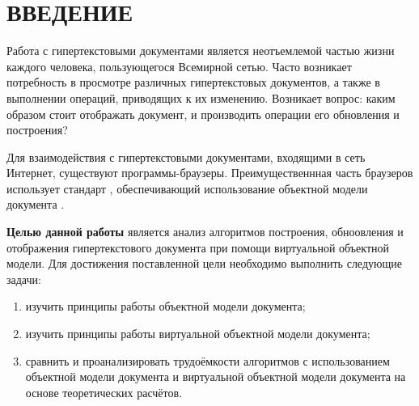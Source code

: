 \section*{ВВЕДЕНИЕ}

Работа с гипертекстовыми документами является неотъемлемой частью жизни каждого человека, пользующегося Всемирной сетью.
Часто возникает потребность в просмотре различных гипертекстовых документов, а также в выполнении операций, приводящих к их изменению.
Возникает вопрос: каким образом стоит отображать документ, и производить операции его обновления и построения?

Для взаимодействия с гипертекстовыми документами, входящими в сеть Интернет, существуют программы-браузеры.
Преимущественнная часть браузеров использует стандарт \cite{dom-doc}, обеспечивающий использование объектной модели документа \cite{dom}. 


\textbf{Целью данной работы} является анализ алгоритмов построения, обноовления и отображения гипертекстового документа при помощи виртуальной объектной модели.
Для достижения поставленной цели необходимо выполнить следующие задачи:

\begin{enumerate}[label=\arabic*)]
	\item изучить принципы работы объектной модели документа;
	\item изучить принципы работы виртуальной объектной модели документа;
	\item сравнить и проанализировать трудоёмкости алгоритмов с использованием объектной модели документа и виртуальной объектной модели документа на основе теоретических расчётов.
\end{enumerate}


\pagebreak